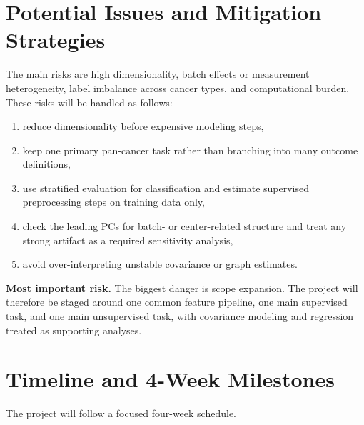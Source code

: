 \documentclass[12pt]{article}
\newcommand{\1}{\mathbf{1}}
\begin{document}
\section{Potential Issues and Mitigation Strategies}

The main risks are high dimensionality, batch effects or measurement heterogeneity, label imbalance across cancer types, and computational burden. These risks will be handled as follows:
\begin{enumerate}
    \item reduce dimensionality before expensive modeling steps,
    \item keep one primary pan-cancer task rather than branching into many outcome definitions,
    \item use stratified evaluation for classification and estimate supervised preprocessing steps on training data only,
    \item check the leading PCs for batch- or center-related structure and treat any strong artifact as a required sensitivity analysis,
    \item avoid over-interpreting unstable covariance or graph estimates.
\end{enumerate}

\begin{warningbox}
\textbf{Most important risk.}
The biggest danger is scope expansion. The project will therefore be staged around one common feature pipeline, one main supervised task, and one main unsupervised task, with covariance modeling and regression treated as supporting analyses.
\end{warningbox}

\section{Timeline and 4-Week Milestones}

The project will follow a focused four-week schedule.
\end{document}
